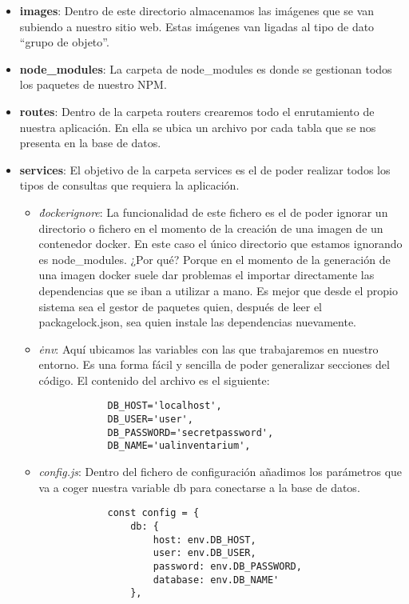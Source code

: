 \begin{itemize}
    \item \textbf{images}: Dentro de este directorio almacenamos las imágenes que se van subiendo a nuestro sitio web. Estas imágenes van ligadas al tipo de dato ``grupo de objeto''.
    \item \textbf{node\_modules}: La carpeta de node\_modules es donde se gestionan todos los paquetes de nuestro NPM.
    \item \textbf{routes}: Dentro de la carpeta routers crearemos todo el enrutamiento de nuestra aplicación. En ella se ubica un archivo por cada tabla que se nos presenta en la base de datos.
    \item \textbf{services}: El objetivo de la carpeta services es el de poder realizar todos los tipos de consultas que requiera la aplicación.
          \begin{itemize}
              \item \textit{\.dockerignore}: La funcionalidad de este fichero es el de poder ignorar un directorio o fichero en el momento de la creación de una imagen de un contenedor docker. En este caso el único directorio que estamos ignorando es node\_modules. ¿Por qué? Porque en el momento de la generación de una imagen docker suele dar problemas el importar directamente las dependencias que se iban a utilizar a mano. Es mejor que desde el propio sistema sea el gestor de paquetes quien, después de leer el package\-lock.json, sea quien instale las dependencias nuevamente.
              \item \textit{\.env}: Aquí ubicamos las variables con las que trabajaremos en nuestro entorno. Es una forma fácil y sencilla de poder generalizar secciones del código. El contenido del archivo es el siguiente:
                    \begin{verbatim}
            DB_HOST='localhost',
            DB_USER='user',
            DB_PASSWORD='secretpassword',
            DB_NAME='ualinventarium',
        \end{verbatim}
              \item \textit{config.js}: Dentro del fichero de configuración añadimos los parámetros que va a coger nuestra variable db para conectarse a la base de datos.
                    \begin{verbatim}
            const config = {
                db: {
                    host: env.DB_HOST,
                    user: env.DB_USER,
                    password: env.DB_PASSWORD,
                    database: env.DB_NAME'
                },

\end{verbatim}
\end{itemize}
\end{itemize}

